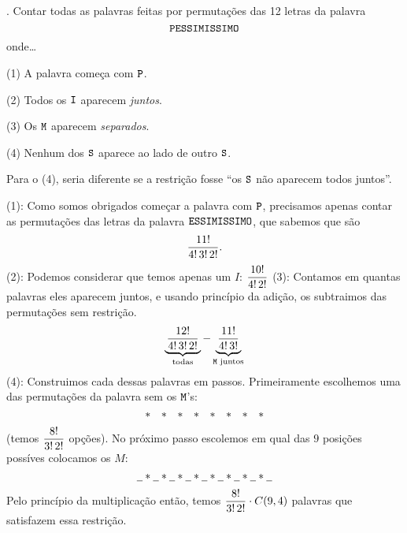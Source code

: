 \endproblem

\problem.
\label{pessimissimo}%
Contar todas as palavras feitas por permutações das 12 letras da palavra
$$
\text{\tt PESSIMISSIMO}
$$
onde\dots
\item{(1)}
A palavra começa com $\text{\tt P}$.
\item{(2)}
Todos os $\text{\tt I}$ aparecem \emph{juntos}.
\item{(3)}
Os $\text{\tt M}$ aparecem \emph{separados}.
\item{(4)}
Nenhum dos $\text{\tt S}$ aparece ao lado de outro $\text{\tt S}$.

\hint
Para o (4), seria diferente se a restrição fosse
``os $\text{\tt S}$ não aparecem todos juntos''.

\solution
(1):
Como somos obrigados começar a palavra com ${\text{\tt P}}$,
precisamos apenas contar as permutações das letras da palavra
$
\text{\tt ESSIMISSIMO}
$,
que sabemos que são
$$
{11!\over4!\,3!\, 2!}.
$$
\endgraf
\medskip
\noindent
(2):
Podemos considerar que temos apenas um $I$:
$
\dfrac
 {10!}
 {4!\,  2!}
$
\endgraf
\medskip
\noindent
(3):
Contamos em quantas palavras eles aparecem juntos,
e usando princípio da adição, os subtraimos das permutações sem restrição.
$$
\underbrace{
\,
\dfrac
 {12!}
 {4!\,  3!\,  2!}
\,
}_{\text{todas}}
 -
\underbrace{
\,
\dfrac
 {11!}
 {4!\,  3!}
\,
}_{\text{$\text{\tt M}$ juntos}}
$$
\endgraf
\noindent(4):
Construimos cada dessas palavras em passos.
Primeiramente escolhemos uma das permutações da palavra sem os ${\text{\tt M}}$'s:
$$
\phantom{\underline{\phantom{{\txt M}}}}*
\phantom{\underline{\phantom{{\txt M}}}}*
\phantom{\underline{\phantom{{\txt M}}}}*
\phantom{\underline{\phantom{{\txt M}}}}*
\phantom{\underline{\phantom{{\txt M}}}}*
\phantom{\underline{\phantom{{\txt M}}}}*
\phantom{\underline{\phantom{{\txt M}}}}*
\phantom{\underline{\phantom{{\txt M}}}}*
\phantom{\underline{\phantom{{\txt M}}}}
$$
(temos 
$
\dfrac
{8!}
{3!\, 2!}
$
opções).
\endgraf
\medskip
No próximo passo escolemos em qual das $9$ posições possíves colocamos os $M$:
$$
\underline{\phantom{{\txt M}}}*
\underline{\phantom{{\txt M}}}*
\underline{\phantom{{\txt M}}}*
\underline{\phantom{{\txt M}}}*
\underline{\phantom{{\txt M}}}*
\underline{\phantom{{\txt M}}}*
\underline{\phantom{{\txt M}}}*
\underline{\phantom{{\txt M}}}*
\underline{\phantom{{\txt M}}}
$$
Pelo princípio da multiplicação então, temos
$
\dfrac
{8!}
{3!\, 2!}
\cdot
C(9,4)
$
palavras que satisfazem essa restrição.

\endproblem

